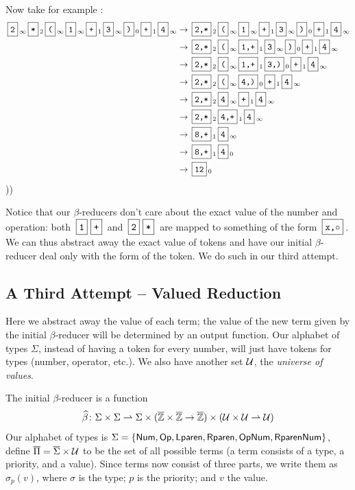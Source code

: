 \documentclass{llncs}
\begin{document}
Now take for example :
\begin{align*}
    \mbt2_\oo \mbt*_2 \mbt(_\oo \mbt1_\oo \mbt+_1 \mbt3_\oo \mbt)_0 \mbt+_1 \mbt4_\oo &\to \mbt{2,*}_2 \mbt(_\oo \mbt1_\oo \mbt+_1 \mbt3_\oo \mbt)_0 \mbt+_1 \mbt4_\oo\\
        &\to \mbt{2,*}_2 \mbt(_\oo \mbt{1,+}_1 \mbt3_\oo \mbt)_0\mbt+_1 \mbt4_\oo\\
        &\to \mbt{2,*}_2 \mbt(_\oo \mbt{1,+}_1 \mbt{3,)}_0 \mbt+_1 \mbt4_\oo\\
        &\to \mbt{2,*}_2 \mbt(_\oo \mbt{4,)}_0 \mbt+_1 \mbt4_\oo\\
        &\to \mbt{2,*}_2 \mbt4_\oo \mbt+_1 \mbt4_\oo\\
        &\to \mbt{2,*}_2 \mbt{4,+}_1 \mbt4_\oo\\
        &\to \mbt{8,+}_1 \mbt4_\oo\\
        &\to \mbt{8,+}_1 \mbt4_0\\
        &\to \mbt{12}_0
\end{align*}
\gobble)\gobble)

Notice that our $\beta$-reducers don't care about the exact value of the number and operation: both $\mbt1\mbt+$ and $\mbt2\mbt*$ are mapped to something of the form $\mbt{x,$\circ$}$.
We can thus abstract away the exact value of tokens and have our initial $\beta$-reducer deal only with the form of the token.
We do such in our third attempt.

\subsection{A Third Attempt -- Valued Reduction} \label{valued-reduction}

Here we abstract away the value of each term; the value of the new term given by the initial $\beta$-reducer will be determined by an output function.
Our alphabet of types $\Sigma$, instead of having a token for every number, will just have tokens for types (number, operator, etc.).
We also have another set $\mathcal U$, the \textit{universe of values}.

The initial $\beta$-reducer is a function
\[ \widehat\beta \colon \Sigma\times\Sigma \rightharpoonup \Sigma\times(\overline{\mathbb Z}\times\overline{\mathbb Z}\to\overline{\mathbb Z})\times(\mathcal U\times\mathcal U\rightharpoonup\mathcal U) \]
Our alphabet of types is $\Sigma=\set{\NUM,\OP,\LPAREN,\RPAREN,\OP\NUM,\RPAREN\NUM}$, define $\overline\Pi=\overline\Sigma\times\mathcal U$ to be the set of all possible terms (a term consists of a type, a priority, and a value).
Since terms now consist of three parts, we write them as $\sigma_p(v)$, where $\sigma$ is the type; $p$ is the priority; and $v$ the value.
\end{document}
